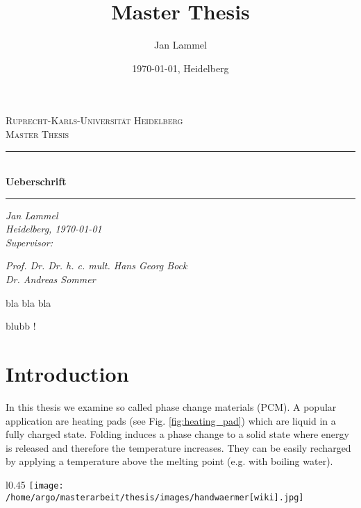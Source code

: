 \documentclass{scrartcl}[12pt, halfparskip]
\title{Master Thesis}
\author{Jan Lammel}
\date{\today{}, Heidelberg}
\begin{document}
\begin{titlepage}
	\begin{center}
	
	\textsc{\large Ruprecht-Karls-Universit\"{a}t Heidelberg} \\[0.5cm]
	\textsc{\large Master Thesis}\\[1cm]
	
	\newcommand{\HRule}{\rule{\linewidth}{0.5mm}}
	\HRule \\[0.4cm]
	\huge \bfseries Ueberschrift
	\HRule 
	
	\vspace{11cm}
	
	\Large \textit{Jan Lammel }\\
	\Large \textit{Heidelberg, \today }\\ \vspace{0.5cm}
	\Large \textit{Supervisor:}
	
	\Large \textit{Prof. Dr. Dr. h. c. mult. Hans Georg Bock}\\
	\Large \textit{Dr. Andreas Sommer}
	
	\end{center}
\end{titlepage}

\newpage

\tableofcontents 
\newpage

 

 bla bla bla
 
 
 \newpage

blubb !

\newpage
{}

\section{Introduction}
In this thesis we examine so called phase change materials (PCM). A popular application are heating pads (see Fig. \ref{fig:heating_pad}) which are liquid in a fully charged state. Folding induces a phase change to a solid state where energy is released and therefore the temperature increases. They can be easily recharged by applying a temperature above the melting point (e.g. with boiling water). 

\begin{wrapfigure}{l}{0.45\textwidth}
	\texttt{[image: /home/argo/masterarbeit/thesis/images/handwaermer[wiki].jpg]}
	\caption{Heating pad \\ left: liquid; right: solid}
	\label{fig:heating_pad}
\end{wrapfigure}
\end{document}
